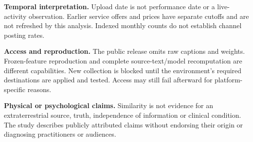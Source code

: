 \textbf{Temporal interpretation.} Upload date is not performance date or a live-activity observation. Earlier service offers and prices have separate cutoffs and are not refreshed by this analysis. Indexed monthly counts do not establish channel posting rates.

\textbf{Access and reproduction.} The public release omits raw captions and weights. Frozen-feature reproduction and complete source-text/model recomputation are different capabilities. New collection is blocked until the environment's required destinations are applied and tested. Access may still fail afterward for platform-specific reasons.

\textbf{Physical or psychological claims.} Similarity is not evidence for an extraterrestrial source, truth, independence of information or clinical condition. The study describes publicly attributed claims without endorsing their origin or diagnosing practitioners or audiences.

